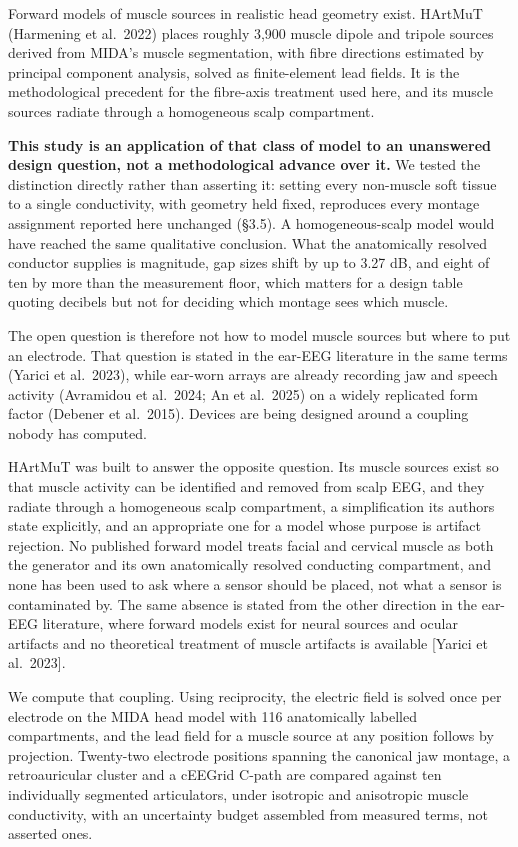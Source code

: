 \documentclass[manuscript,review,anonymous]{acmart}
\newcounter{none}
\begin{document}
Forward models of muscle sources in realistic head geometry exist. HArtMuT
(Harmening et al.~2022) places roughly 3,900 muscle dipole and tripole sources
derived from MIDA's muscle segmentation, with fibre directions estimated by
principal component analysis, solved as finite-element lead fields. It is the
methodological precedent for the fibre-axis treatment used here, and its
muscle sources radiate through a homogeneous scalp compartment.

\textbf{This study is an application of that class of model to an unanswered design
question, not a methodological advance over it.} We tested the distinction
directly rather than asserting it: setting every non-muscle soft tissue to a
single conductivity, with geometry held fixed, reproduces every montage
assignment reported here unchanged (\S{}3.5). A homogeneous-scalp model would
have reached the same qualitative conclusion. What the anatomically resolved
conductor supplies is magnitude, gap sizes shift by up to 3.27 dB, and eight
of ten by more than the measurement floor, which matters for a design table
quoting decibels but not for deciding which montage sees which muscle.

The open question is therefore not how to model muscle sources but where to
put an electrode. That question is stated in the ear-EEG literature in the
same terms (Yarici et al.~2023), while ear-worn arrays are already recording
jaw and speech activity (Avramidou et al.~2024; An et al.~2025) on a widely
replicated form factor (Debener et al.~2015). Devices are being designed
around a coupling nobody has computed.

HArtMuT was built to answer the opposite question. Its muscle sources exist so
that muscle activity can be identified and removed from scalp EEG, and they
radiate through a homogeneous scalp compartment, a simplification its authors
state explicitly, and an appropriate one for a model whose purpose is artifact
rejection. No published forward model treats facial and cervical muscle as both
the generator and its own anatomically resolved conducting compartment, and none
has been used to ask where a sensor should be placed, not what a sensor is
contaminated by. The same absence is stated from the other direction in the
ear-EEG literature, where forward models exist for neural sources and ocular
artifacts and no theoretical treatment of muscle artifacts is available {[}Yarici
et al.~2023{]}.

We compute that coupling. Using reciprocity, the electric field is solved once
per electrode on the MIDA head model with 116 anatomically labelled
compartments, and the lead field for a muscle source at any position follows by
projection. Twenty-two electrode positions spanning the canonical jaw montage, a
retroauricular cluster and a cEEGrid C-path are compared against ten
individually segmented articulators, under isotropic and anisotropic muscle
conductivity, with an uncertainty budget assembled from measured terms, not
asserted ones.
\end{document}
